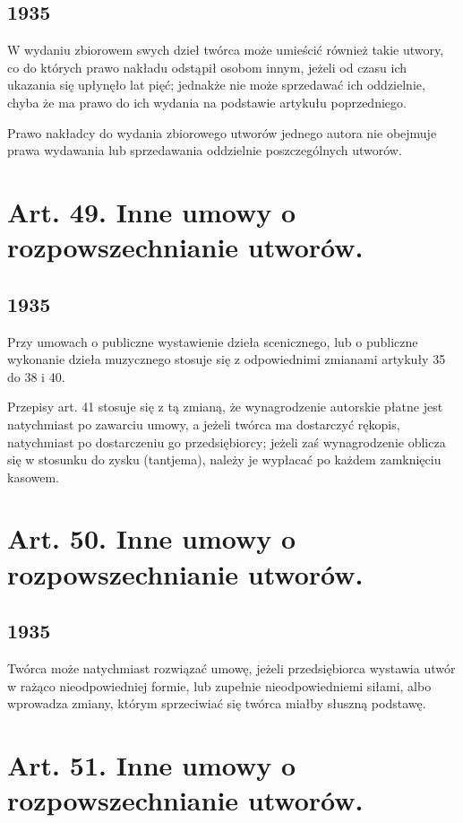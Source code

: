 \documentclass[withmarginpar]{book}
\begin{document}
\subsection{1935}
\label{sec:art.-48-1}

W wydaniu zbiorowem swych dzieł twórca może umieścić również takie
utwory, co do których prawo nakładu odstąpił osobom innym, jeżeli od
czasu ich ukazania się upłynęło lat pięć; jednakże nie może sprzedawać
ich oddzielnie, chyba że ma prawo do ich wydania na podstawie artykułu
poprzedniego.

Prawo nakładcy do wydania zbiorowego utworów jednego autora nie
obejmuje prawa wydawania lub sprzedawania oddzielnie poszczególnych
utworów.

\section{Art. 49. Inne umowy o rozpowszechnianie utworów.}
\label{sec:art.-49}
\subsection{1935}
\label{sec:art.-49-1}

Przy umowach o publiczne wystawienie dzieła scenicznego, lub o
publiczne wykonanie dzieła muzycznego stosuje się z odpowiednimi
zmianami artykuły 35 do 38 i 40.

Przepisy art. 41 stosuje się z tą zmianą, że wynagrodzenie autorskie
płatne jest natychmiast po zawarciu umowy, a jeżeli twórca ma
dostarczyć rękopis, natychmiast po dostarczeniu go przedsiębiorcy;
jeżeli zaś wynagrodzenie oblicza się w stosunku do zysku (tantjema),
należy je wypłacać po każdem zamknięciu kasowem.



\section{Art. 50. Inne umowy o rozpowszechnianie utworów.}
\label{sec:art.-50}
\subsection{1935}
\label{sec:art.-50-1}

Twórca może natychmiast rozwiązać umowę, jeżeli przedsiębiorca
wystawia utwór w rażąco nieodpowiedniej formie, lub zupełnie
nieodpowiedniemi siłami, albo wprowadza zmiany, którym sprzeciwiać się
twórca miałby słuszną podstawę.

\section{Art. 51. Inne umowy o rozpowszechnianie utworów.}
\label{sec:art.-51}
\end{document}
